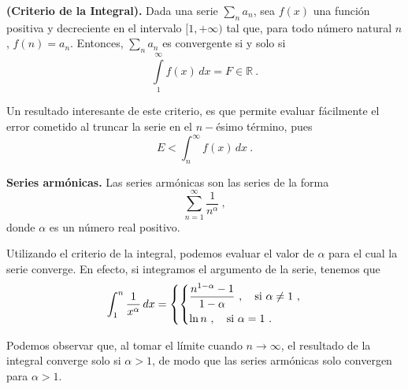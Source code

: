
\begin{teorema}{\textbf{(Criterio de la Integral).}}
    Dada una serie $\sum\limits_n a_n$, sea $f(x)$ una función positiva y decreciente en el intervalo $[1, +\infty)$ tal que, para todo número natural $n$, $f(n) = a_n$. Entonces, $\sum\limits_n a_n$ es convergente si y solo si 
    \begin{equation}
        \int\limits_1^\infty f(x) \, dx = F \in \mathbb{R} \ .
    \end{equation}
\end{teorema}

Un resultado interesante de este criterio, es que permite evaluar fácilmente el error cometido al truncar la serie en el $n-$ésimo término, pues 
\begin{equation}
    E < \int_n^\infty f(x) \, dx \ .
\end{equation}

\begin{ejemplo}
    \textbf{Series armónicas.} Las series armónicas son las series de la forma 
    \begin{equation}
        \sum_{n=1}^\infty \frac{1}{n^\alpha} \ ,
    \end{equation}
    donde $\alpha$ es un número real positivo.
    
    Utilizando el criterio de la integral, podemos evaluar el valor de $\alpha$ para el cual la serie converge. En efecto, si integramos el argumento de la serie, tenemos que 
    \begin{equation*}
        \int_1^n \frac{1}{x^\alpha} \, dx = \left\{ \begin{dcases}
            \dfrac{n^{1-\alpha}-1}{1-\alpha} \ , \quad \text{si } \alpha \neq 1 \ , \\
            \ln n \ , \quad \text{si } \alpha = 1 \ .
        \end{dcases} \right.
    \end{equation*}

    Podemos observar que, al tomar el límite cuando $n\to\infty$, el resultado de la integral converge solo si $\alpha > 1$, de modo que las series armónicas solo convergen para $\alpha > 1$.
\end{ejemplo}



